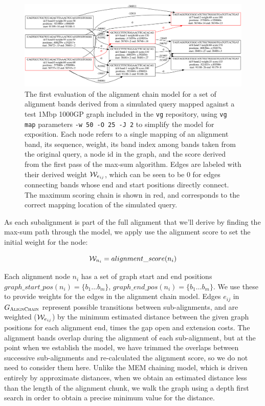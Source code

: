 \begin{figure}[htbp!]
\centering
\includegraphics[width=1.0\textwidth]{Chapter2/Figs/alignchain_dag.pdf}
\caption[The Alignment Chain Model]{
  The first evaluation of the alignment chain model for a set of alignment bands derived from a simulated query mapped against a test 1Mbp 1000GP graph included in the {\tt vg} repository, using {\tt vg map} parameters {\tt -w 50 -O 25 -J 2} to simplify the model for exposition.
  Each node refers to a single mapping of an alignment band, its sequence, weight, its band index among bands taken from the original query, a node id in the graph, and the score derived from the first pass of the max-sum algorithm.
  Edges are labeled with their derived weight ${\cal W}_{e_{ij}}$, which can be seen to be 0 for edges connecting bands whose end and start positions directly connect.
  The maximum scoring chain is shown in red, and corresponds to the correct mapping location of the simulated query.
}
\label{fig:alignmentchain_model}
\end{figure}


As each subalignment is part of the full alignment that we'll derive by finding the max-sum path through the model, we apply use the alignment score to set the initial weight for the node:

\begin{equation}
  {\cal W}_{n_i} = alignment\_score(n_i)
\end{equation}

Each alignment node $n_i$ has a set of graph start and end positions $graph\_start\_pos(n_i) = \{ b_1 \ldots b_m \}$, $graph\_end\_pos(n_i) = \{ b_1 \ldots b_m \}$.
We use these to provide weights for the edges in the alignment chain model.
Edges $e_{ij}$ in $G_\textsc{AlignChain}$ represent possible transitions between sub-alignments, and are weighted (${\cal W}_{e_{ij}}$) by the minimum estimated distance between the given graph positions for each alignment end, times the gap open and extension costs.
The alignment bands overlap during the alignment of each sub-alignment, but at the point when we establish the model, we have trimmed the overlaps between successive sub-alignments and re-calculated the alignment score, so we do not need to consider them here.
Unlike the MEM chaining model, which is driven entirely by approximate distances, when we obtain an estimated distance less than the length of the alignment chunk, we walk the graph using a depth first search in order to obtain a precise minimum value for the distance.

